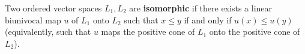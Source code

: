 Two ordered vector spaces $L_1, L_2$ are \textbf{isomorphic} if there exists a linear biunivocal map $u$ of $L_1$ onto $L_2$ such that $x \leq y$ if and only if $u(x) \leq u(y)$ (equivalently, such that $u$ maps the positive cone of $L_1$ onto the positive cone of $L_2$).

